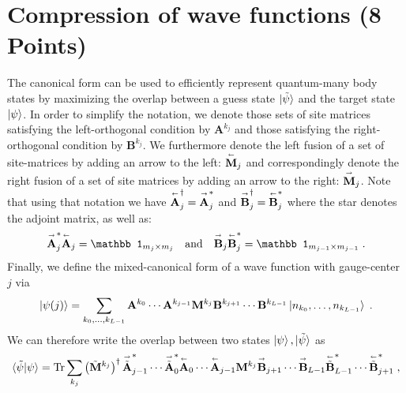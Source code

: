 \documentclass[a4paper, 12pt]{article}
\begin{document}
%
\section{Compression of wave functions \textbf{(8 Points)}}
%
The canonical form can be used to efficiently represent quantum-many body states by maximizing the overlap between a guess state $\ket{\tilde \psi}$ and the target state $\ket{\psi}$.
%
In order to simplify the notation, we denote those sets of site matrices satisfying the left-orthogonal condition by $\mathbf A^{k_j}$ and those satisfying the right-orthogonal condition by $\mathbf B^{k_{j}}$.
%
We furthermore denote the left fusion of a set of site-matrices by adding an arrow to the left: $\overset{\shortleftarrow}{\mathbf M}_j$ and correspondingly denote the right fusion of a set of site matrices by adding an arrow to the right: $\overset{\shortrightarrow}{\mathbf M}_j$.
%
Note that using that notation we have $\overset{\shortleftarrow}{\mathbf A}_j^\dagger = \overset{\shortrightarrow}{\mathbf A}^*_j$ and $\overset{\shortrightarrow}{\mathbf B}_j^\dagger = \overset{\shortleftarrow}{\mathbf B}^*_j$ where the star denotes the adjoint matrix, as well as:
\begin{equation}
	\overset{\shortrightarrow}{\mathbf A}^*_j \overset{\shortleftarrow}{\mathbf A}_j = \mathbb 1_{m_j \times m_j} \quad \text{and} \quad
	\overset{\shortrightarrow}{\mathbf B}_j \overset{\shortleftarrow}{\mathbf B}^*_j = \mathbb 1_{m_{j-1} \times m_{j-1}} \; .
\end{equation}
%
Finally, we define the mixed-canonical form of a wave function with gauge-center $j$ via
\begin{equation}
	\ket{\psi(j)} = \sum_{k_0,\ldots,k_{L-1}} \mathbf A^{k_0} \cdots \mathbf A^{k_{j-1}} \mathbf M^{k_j} \mathbf B^{k_{j+1}} \cdots \mathbf B^{k_{L-1}} \ket{n_{k_0}, \ldots, n_{k_{L-1}}} \; .
\end{equation}
%
We can therefore write the overlap between two states $\ket{\psi}, \ket{\tilde \psi}$ as
\begin{equation}
	\braket{\tilde \psi | \psi}
	=
	\operatorname{Tr} \sum_{k_j}  \left(\tilde{\mathbf M}^{k_j}\right)^\dagger \overset{\shortrightarrow}{\tilde{\mathbf A}}^*_{j-1} \cdots \overset{\shortrightarrow}{\tilde{\mathbf A}}^*_{0} \overset{\shortleftarrow}{\mathbf A}_{0} \cdots \overset{\shortleftarrow}{\mathbf A}_{j-1} \mathbf M^{k_j} \overset{\shortrightarrow}{\mathbf{B}}_{j+1} \cdots \overset{\shortrightarrow}{\mathbf{B}}_{L-1}\overset{\shortleftarrow}{\tilde{\mathbf{B}}}^*_{L-1} \cdots \overset{\shortleftarrow}{\tilde{\mathbf{B}}}^*_{j+1}  \; ,
\end{equation}
\end{document}
